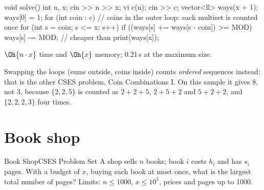 \begin{code}
void solve() {
    int n, x;
    cin >> n >> x;
    vi c(n);
    cin >> c;
    vector<ll> ways(x + 1);
    ways[0] = 1;
    for (int coin : c)  // coins in the outer loop: each multiset is counted once
        for (int s = coin; s <= x; s++)
            if ((ways[s] += ways[s - coin]) >= MOD) ways[s] -= MOD;  // cheaper than %
    print(ways[x]);
}
\end{code}

 $\Oh{n\cdot x}$ time and $\Oh{x}$ memory; 0.21\,s at the maximum size.

\begin{pitfall}
Swapping the loops (sums outside, coins inside) counts \emph{ordered} sequences instead: that is the other CSES problem,
Coin Combinations I. On this sample it gives 8, not 3, because $\{2,2,5\}$ is counted as $2{+}2{+}5$, $2{+}5{+}2$ and
$5{+}2{+}2$, and $\{2,2,2,3\}$ four times.
\end{pitfall}


\section[Book shop]{Book shop \hfill \gold}\label{wp:books}

\begin{statement}{Book Shop}{CSES Problem Set}
A shop sells $n$ books; book $i$ costs $h_i$ and has $s_i$ pages. With a budget of $x$, buying each book at most once, what
is the largest total number of pages? Limits: $n \le 1000$, $x \le 10^5$, prices and pages up to 1000.
\end{statement}


